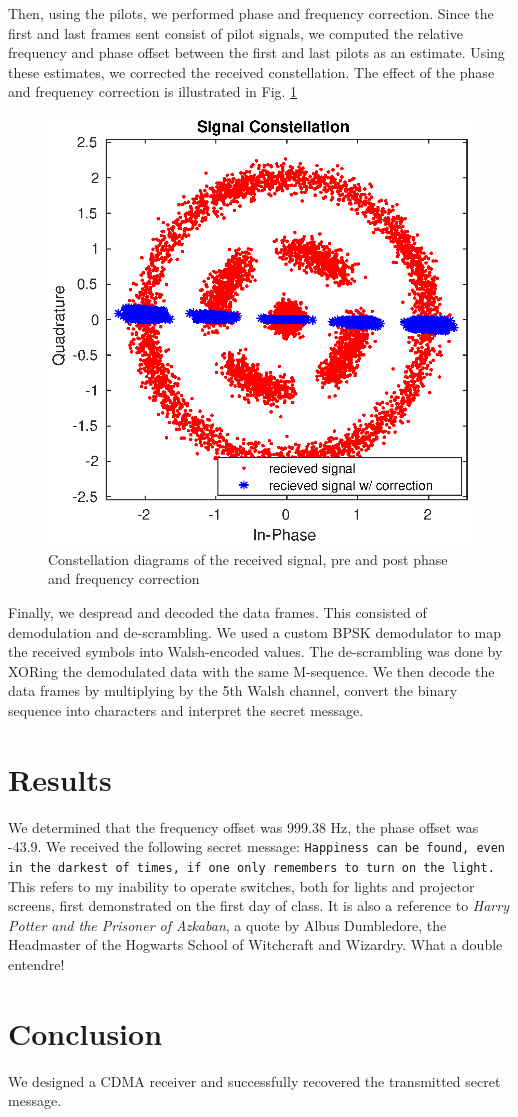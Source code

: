 \documentclass[conference]{IEEEtran}
\begin{document}
Then, using the pilots, we performed phase and frequency correction. Since the first and last frames sent consist of pilot signals, we computed the relative frequency and phase offset between the first and last pilots as an estimate. Using these estimates, we corrected the received constellation. The effect of the phase and frequency correction is illustrated in Fig. \ref{fig:const}
\begin{figure}[htbp]
\centerline{\includegraphics[scale=.75]{./media/constellation.eps}}
\caption{Constellation diagrams of the received signal, pre and post phase and frequency correction }
\label{fig:const}
\end{figure}
Finally, we despread and decoded the data frames. This consisted of demodulation and de-scrambling. We used a custom BPSK demodulator to map the received symbols into Walsh-encoded values. The de-scrambling was done by XORing the demodulated data with the same M-sequence. We then decode the data frames by multiplying by the 5th Walsh channel, convert the binary sequence into characters and interpret the secret message.


\section{Results} 
We determined that the frequency offset was 999.38 Hz, the phase offset was -43.9\textdegree. We received the following secret message: \texttt{Happiness can be found, even in the darkest of times, if one only remembers to turn on the light.} This refers to my inability to operate switches, both for lights and projector screens, first demonstrated on the first day of class. It is also a reference to \textit{Harry Potter and the Prisoner of Azkaban}, a quote by Albus Dumbledore, the Headmaster of the Hogwarts School of Witchcraft and Wizardry. What a double entendre!

\section{Conclusion} 
We designed a CDMA receiver and successfully recovered the transmitted secret message.  
%
%
\end{document}
